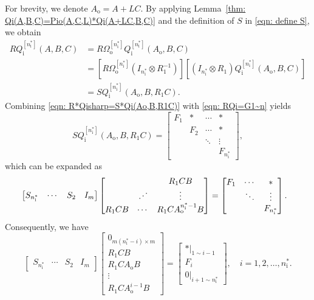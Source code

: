 \documentclass[sort&compress]{elsarticle}
\newcommand\adots{\mathinner{\mkern2mu%
	\raisebox{0.1em}{.}\mkern2mu\raisebox{0.4em}{.}%
	\mkern2mu\raisebox{0.7em}{.}\mkern1mu}}
\newcommand\Ao{A_\mathrm o}
\newcommand\nsharp{n_\mathrm i^*}
\newcommand\Pio{\mathit\Omega_\mathrm o}
\newcommand\Qi{Q_\mathrm i}
\begin{document}
For brevity, we denote $\Ao = A + LC$.
By applying Lemma~\ref{thm: Qi(A,B,C)=Pio(A,C,L)*Qi(A+LC,B,C)}
and the definition of $S$ in \eqref{eqn: define S}, we obtain
\begin{equation}\label{eqn: R*Qisharp=S*Qi(Ao,B,R1C)}
\begin{aligned}
R\Qi^{[\nsharp]}(A,B,C)
&
= R\Pio^{[\nsharp]} \Qi^{[\nsharp]}(\Ao,B,C)
\\
&
= \left[ R\Pio^{[\nsharp]} (I_{\nsharp} \otimes R_1^{-1}) \right]
\left[ (I_{\nsharp} \otimes R_1) \Qi^{[\nsharp]}(\Ao,B,C) \right]
\\
&
= S \Qi^{[\nsharp]}(\Ao, B, R_1C).
\end{aligned}
\end{equation}
Combining \eqref{eqn: R*Qisharp=S*Qi(Ao,B,R1C)} with \eqref{eqn: RQi=G1~n} yields
\[
S \Qi^{[\nsharp]}(\Ao, B, R_1C)
= \begin{bmatrix}
F_1 & * & \cdots & * \\
& F_2 & \cdots & * \\
& & \ddots & \vdots \\
& & & F_{\nsharp}
\end{bmatrix},
\]
which can be expanded as
\begin{align*}
&\begin{bmatrix} S_{\nsharp} & \cdots & S_2 & I_m \end{bmatrix}
\begin{bmatrix}
&& R_1CB \\
& \adots & \vdots \\
R_1CB & \cdots & R_1C\Ao^{\nsharp-1}B
\end{bmatrix}
= \begin{bmatrix}
F_1 & \cdots & * \\
& \ddots & \vdots \\
&& F_{\nsharp}
\end{bmatrix}.
\end{align*}
Consequently, we have
\[
\begin{bmatrix} S_{\nsharp} & \cdots & S_2 & I_m \end{bmatrix}
\begin{bmatrix}
0_{m(\nsharp-i) \times m} \\ R_1CB \\ R_1C\Ao B \\ \vdots \\ R_1C\Ao^{i-1}B
\end{bmatrix}
= \begin{bmatrix}
*|_{1\sim i-1} \\ F_i \\ 0|_{i+1\sim\nsharp}
\end{bmatrix},
\quad
i=1,2,\dots,\nsharp.
\]
\end{document}
